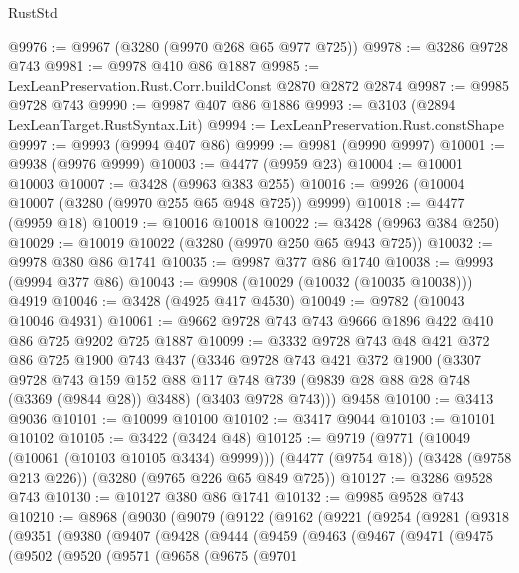 \begin{lexlean}{RustStd}
\begin{coremodule}
@9976 := @9967 (@3280 (@9970 @268 @65 @977 @725))
@9978 := @3286 @9728 @743
@9981 := @9978 @410 @86 @1887
@9985 := LexLeanPreservation.Rust.Corr.buildConst @2870 @2872 @2874
@9987 := @9985 @9728 @743
@9990 := @9987 @407 @86 @1886
@9993 := @3103 (@2894 LexLeanTarget.RustSyntax.Lit)
@9994 := LexLeanPreservation.Rust.constShape
@9997 := @9993 (@9994 @407 @86)
@9999 := @9981 (@9990 @9997)
@10001 := @9938 (@9976 @9999)
@10003 := @4477 (@9959 @23)
@10004 := @10001 @10003
@10007 := @3428 (@9963 @383 @255)
@10016 := @9926 (@10004 @10007 (@3280 (@9970 @255 @65 @948 @725)) @9999)
@10018 := @4477 (@9959 @18)
@10019 := @10016 @10018
@10022 := @3428 (@9963 @384 @250)
@10029 := @10019 @10022 (@3280 (@9970 @250 @65 @943 @725))
@10032 := @9978 @380 @86 @1741
@10035 := @9987 @377 @86 @1740
@10038 := @9993 (@9994 @377 @86)
@10043 := @9908 (@10029 (@10032 (@10035 @10038))) @4919
@10046 := @3428 (@4925 @417 @4530)
@10049 := @9782 (@10043 @10046 @4931)
@10061 := @9662 @9728 @743 @743 @9666 @1896 @422 @410 @86 @725 @9202 @725 @1887
@10099 := @3332
    @9728
    @743
    @48
    @421
    @372
    @86
    @725
    @1900
    @743
    @437
    (@3346
      @9728
      @743
      @421
      @372
      @1900
      (@3307
        @9728
        @743
        @159
        @152
        @88
        @117
        @748
        @739
        (@9839 @28 @88 @28 @748 (@3369 (@9844 @28)) @3488)
        (@3403 @9728 @743)))
    @9458
@10100 := @3413 @9036
@10101 := @10099 @10100
@10102 := @3417 @9044
@10103 := @10101 @10102
@10105 := @3422 (@3424 @48)
@10125 := @9719
    (@9771 (@10049 (@10061 (@10103 @10105 @3434) @9999)))
    (@4477 (@9754 @18))
    (@3428 (@9758 @213 @226))
    (@3280 (@9765 @226 @65 @849 @725))
@10127 := @3286 @9528 @743
@10130 := @10127 @380 @86 @1741
@10132 := @9985 @9528 @743
@10210 := @8968
    (@9030
      (@9079
        (@9122
          (@9162
            (@9221
              (@9254
                (@9281
                  (@9318
                    (@9351
                      (@9380
                        (@9407
                          (@9428
                            (@9444
                              (@9459
                                (@9463
                                  (@9467
                                    (@9471
                                      (@9475
                                        (@9502
                                          (@9520
                                            (@9571
                                              (@9658
                                                (@9675
                                                  (@9701

\end{coremodule}
\end{lexlean}
